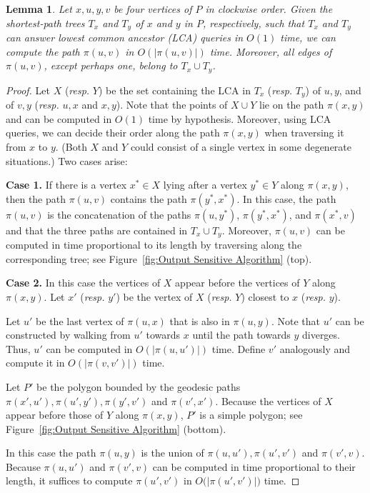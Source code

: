 \documentclass[a4paper]{article}
\newtheorem{lemma}[theorem]{Lemma}
\newcommand{\p}[2]{\ensuremath{\pi(#1, #2)}}
\begin{document}
\begin{lemma}\label{lemma:Suri's lemma}
Let $x, u, y, v$ be four vertices of $P$ in clockwise order.
Given the shortest-path trees $T_x$ and $T_y$ of $x$ and $y$ in $P$, respectively, such that $T_x$ and $T_y$ can answer lowest common ancestor (LCA) queries in $O(1)$ time, 
we can compute the path $\p{u}{v}$ in $O(|\p{u}{v}|)$ time. 
Moreover, all edges of $\p{u}{v}$, except perhaps one, belong to $T_x\cup T_y$.
\end{lemma}
\begin{proof}
Let $X$ (\emph{resp.} $Y$) be the set containing the LCA in $T_x$ (\emph{resp.} $T_y$) of $u,y$, and of $v,y$ (\emph{resp.} $u,x$ and $x,y$). Note that the points of $X\cup Y$ lie on the path $\p{x}{y}$ and can be computed in $O(1)$ time by hypothesis. Moreover, using LCA queries, we can decide their order along the path $\p{x}{y}$ when traversing it from $x$ to $y$. (Both $X$ and $Y$ could consist of a single vertex in some degenerate situations.) Two cases arise: 

\textbf{Case 1.} If there is a vertex  $x^*\in X$ lying after a vertex $y^*\in Y$ along $\p{x}{y}$, 
then the path $\p{u}{v}$ contains the path $\p{y^*}{x^*}$. 
In this case, the path $\p{u}{v}$ is the concatenation of the paths $\p{u}{y^*}$, $\p{y^*}{x^*}$, and $\p{x^*}{v}$ and that the three paths are contained in $T_x \cup T_y$.
Moreover, $\p{u}{v}$ can be computed in time proportional to its length by traversing along the corresponding tree; see Figure~\ref{fig:Output Sensitive Algorithm} (top).

\textbf{Case 2.} In this case the vertices of $X$ appear before the vertices of $Y$ along $\p{x}{y}$.
Let $x'$ (\emph{resp.} $y'$) be the vertex of $X$ (\emph{resp.} $Y$) closest to $x$ (\emph{resp.} $y$). 

Let $u'$ be the last vertex of $\p{u}{x}$ that is also in $\p{u}{y}$.
Note that $u'$ can be constructed by walking from $u'$ towards $x$ until the path towards $y$ diverges. 
Thus, $u'$ can be computed in $O(|\p{u}{u'}|)$ time. 
Define $v'$ analogously and compute it in $O(|\p{v}{v'}|)$ time.

Let $P'$ be the polygon bounded by the geodesic paths $\p{x'}{u'}, \p{u'}{y'}, \p{y'}{v'}$ and  $\p{v'}{x'}$.
Because the vertices of $X$ appear before those of $Y$ along $\p{x}{y}$, $P'$ is a simple polygon; see Figure~\ref{fig:Output Sensitive Algorithm} (bottom).

In this case the path $\p{u}{y}$ is the union of $\p{u}{u'}, \p{u'}{v'}$ and $\p{v'}{v}$.
Because $\p{u}{u'}$ and  $\p{v'}{v}$ can be computed in time proportional to their length, it suffices to compute $\p{u'}{v'}$ in $O(|$\p{u'}{v'}$|)$ time.


\end{proof}
\end{document}
